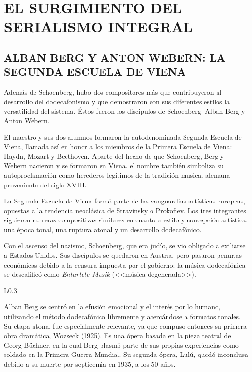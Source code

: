 \chapter{EL SURGIMIENTO DEL SERIALISMO INTEGRAL}
	\section[ALBAN BERG Y ANTON WEBERN]{ALBAN BERG Y ANTON WEBERN: LA SEGUNDA ESCUELA DE VIENA}
	\label{berweb}
	Además de Schoenberg, hubo dos compositores más que contribuyeron al desarrollo del dodecafonismo y que demostraron con sus diferentes estilos la versatilidad del sistema. Éstos fueron los discípulos de Schoenberg: Alban Berg y Anton Webern. 
	
	El maestro y sus dos alumnos formaron la autodenominada Segunda Escuela de Viena, llamada así en honor a los miembros de la Primera Escuela de Viena: Haydn, Mozart y Beethoven. Aparte del hecho de que Schoenberg, Berg y Webern nacieron y se formaron en Viena, el nombre también simboliza su autoproclamación como herederos legítimos de la tradición musical alemana proveniente del siglo XVIII.
	
	La Segunda Escuela de Viena formó parte de las vanguardias artísticas europeas, opuestas a la tendencia neoclásica de Stravinsky o Prokofiev. Los tres integrantes siguieron carreras compositivas similares en cuanto a estilo y concepción artística: una época tonal, una ruptura atonal y un desarrollo dodecafónico.
	
	Con el ascenso del nazismo, Schoenberg, que era judío, se vio obligado a exiliarse a Estados Unidos. Sus discípulos se quedaron en Austria, pero pasaron penurias económicas debido a la censura impuesta por el gobierno: la música dodecafónica se descalificó como \emph{Entartete Musik} (<<música degenerada>>).
	
	\begin{wrapfigure}{L}{0.3\textwidth}
		\captionsetup{justification=centering, font=footnotesize}
		\vspace{0cm}
	\end{wrapfigure}
	Alban Berg se centró en la efusión emocional y el interés por lo humano, utilizando el método dodecafónico libremente y acercándose a formatos tonales. Su etapa atonal fue especialmente relevante, ya que compuso entonces su primera obra dramática, Wozzeck (1925). Es una ópera basada en la pieza teatral de Georg Büchner, en la cual Berg plasmó parte de sus propias experiencias como soldado en la Primera Guerra Mundial. Su segunda ópera, Lulú, quedó inconclusa debido a su muerte por septicemia en 1935, a los 50 años.
	
